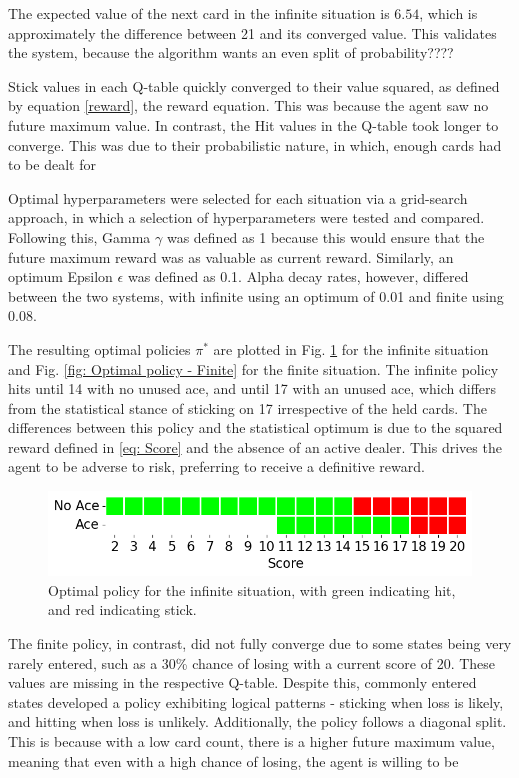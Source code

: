 The expected value of the next card in the infinite situation is \(6.54\), which is approximately the difference between 21 and its converged value. This validates the system, because the algorithm wants an even split of probability????

Stick values in each Q-table quickly converged to their value squared, as defined by equation \ref{reward}, the reward equation. This was because the agent saw no future maximum value. In contrast, the Hit values in the Q-table took longer to converge. This was due to their probabilistic nature, in which, enough cards had to be dealt for 

Optimal hyperparameters were selected for each situation via a grid-search approach, in which a selection of hyperparameters were tested and compared. Following this, Gamma \(\gamma\) was defined as 1 because this would ensure that the future maximum reward was as valuable as current reward. Similarly, an optimum Epsilon \(\epsilon\) was defined as 0.1. Alpha decay rates, however, differed between the two systems, with infinite using an optimum of 0.01 and finite using 0.08. 

The resulting optimal policies \(\pi^*\) are plotted in Fig. \ref{fig: Optimal policy - Infinite} for the infinite situation and Fig. \ref{fig: Optimal policy - Finite} for the finite situation. The infinite policy hits until 14 with no unused ace, and until 17 with an unused ace, which differs from the statistical stance of sticking on 17 irrespective of the held cards. The differences between this policy and the statistical optimum is due to the squared reward defined in \ref{eq: Score} and the absence of an active dealer. This drives the agent to be adverse to risk, preferring to receive a definitive reward. 

\begin{figure}[ht]
    \centering
    \includegraphics[width=\singlefigure]{figures/infinite_optimal_policy.png}
    \caption{Optimal policy for the infinite situation, with green indicating hit, and red indicating stick.}
    \label{fig: Optimal policy - Infinite} 
\end{figure}

The finite policy, in contrast, did not fully converge due to some states being very rarely entered, such as a 30\% chance of losing with a current score of 20. These values are missing in the respective Q-table. Despite this, commonly entered states developed a policy exhibiting logical patterns - sticking when loss is likely, and hitting when loss is unlikely. Additionally, the policy follows a diagonal split. This is because with a low card count, there is a higher future maximum value, meaning that even with a high chance of losing, the agent is willing to be 

